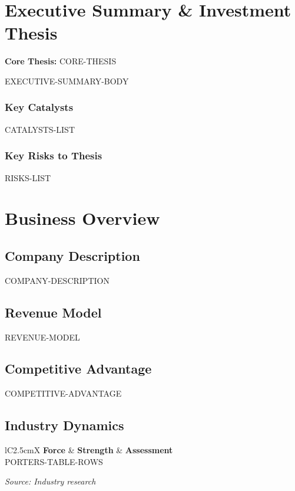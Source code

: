 \documentclass[11pt,a4paper]{report}
\newcommand{\highlightbox}[2][gslightblue]{%
  \begin{center}
    \colorbox{#1}{\begin{minipage}{0.92\textwidth}\vspace{8pt}#2\vspace{8pt}\end{minipage}}
  \end{center}
}
\newcommand{\source}[1]{\hfill\small\textit{#1}}
\begin{document}
\newpage
\tableofcontents
\newpage

\chapter{Executive Summary \& Investment Thesis}

\highlightbox{%
\textbf{Core Thesis:} CORE-THESIS
}

EXECUTIVE-SUMMARY-BODY

\subsection*{Key Catalysts}
\begin{itemize}[nosep]
  CATALYSTS-LIST
\end{itemize}

\subsection*{Key Risks to Thesis}
\begin{itemize}[nosep]
  RISKS-LIST
\end{itemize}

\chapter{Business Overview}

\section{Company Description}
COMPANY-DESCRIPTION

\section{Revenue Model}
REVENUE-MODEL

\section{Competitive Advantage}
COMPETITIVE-ADVANTAGE

\section{Industry Dynamics}
\begin{table}[H]
\centering
\caption{Porter's Five Forces Analysis}
\begin{tabularx}{\textwidth}{lC{2.5cm}X}
\toprule
\textbf{Force} & \textbf{Strength} & \textbf{Assessment} \\
\midrule
PORTERS-TABLE-ROWS
\bottomrule
\end{tabularx}
\source{Source: Industry research}
\end{table}
\end{document}
